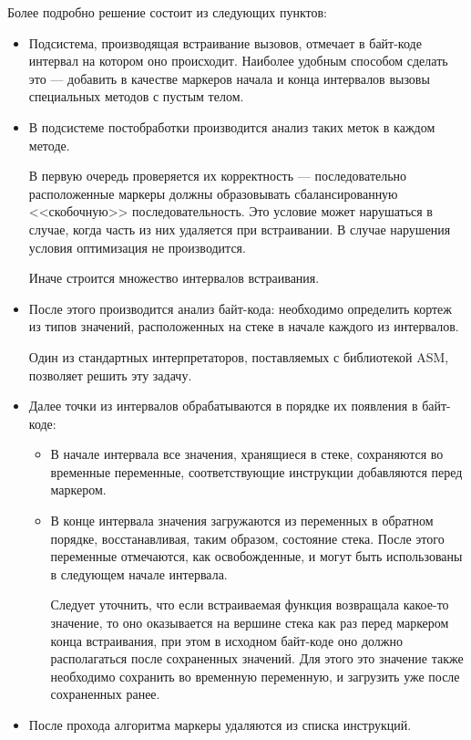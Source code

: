 Более подробно решение состоит из следующих пунктов:
\begin{itemize}
    \item Подсистема, производящая встраивание вызовов, отмечает в байт-коде интервал
    на котором оно происходит.
    Наиболее удобным способом сделать это --- добавить в качестве маркеров начала и конца
    интервалов вызовы специальных методов с пустым телом.

    \item В подсистеме постобработки производится анализ таких меток в каждом методе.

    В первую очередь проверяется их корректность --- последовательно расположенные маркеры должны
    образовывать сбалансированную <<скобочную>> последовательность.
    Это условие может нарушаться в случае, когда часть из них удаляется при встраивании.
    В случае нарушения условия оптимизация не производится.

    Иначе строится множество интервалов встраивания.

    \item После этого производится анализ байт-кода: необходимо определить кортеж из типов
    значений, расположенных на стеке в начале каждого из интервалов.

    Один из стандартных интерпретаторов, поставляемых с библиотекой ASM, позволяет решить эту
    задачу.

    \item Далее точки из интервалов обрабатываются в порядке их появления в байт-коде:
    \begin{itemize}
        \item В начале интервала все значения, хранящиеся в стеке,
        сохраняются во временные переменные, соответствующие инструкции добавляются перед маркером.
        \item В конце интервала значения загружаются из переменных в обратном порядке,
        восстанавливая, таким образом, состояние стека.
        После этого переменные отмечаются, как освобожденные, и могут быть использованы
        в следующем начале интервала.

        Следует уточнить, что если встраиваемая функция возвращала какое-то значение, то оно
        оказывается на вершине стека как раз перед маркером конца встраивания, при этом
        в исходном байт-коде оно должно располагаться после сохраненных значений.
        Для этого это значение также необходимо сохранить во временную переменную, и загрузить
        уже после сохраненных ранее.
    \end{itemize}

    \item После прохода алгоритма маркеры удаляются из списка инструкций.
\end{itemize}

